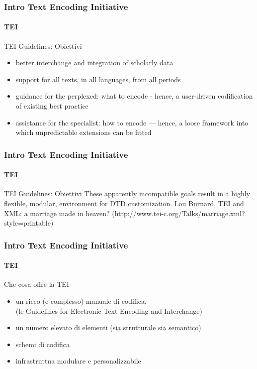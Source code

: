 \begin{frame}
	\frametitle{Intro Text Encoding Initiative}
	\framesubtitle{TEI}
	\addtocounter{nframe}{1}

	\begin{block}{TEI Guidelines: Obiettivi}
		\begin{itemize}
			\item better interchange and integration of scholarly data
			\item support for all texts, in all languages, from all periods
			\item guidance for the perplexed: what to encode - hence, a user-driven codification of existing best practice
			\item assistance for the specialist: how to encode --- hence, a loose framework into which unpredictable extensions can be fitted
		\end{itemize}
	\end{block}

\end{frame}



\begin{frame}
	\frametitle{Intro Text Encoding Initiative}
	\framesubtitle{TEI}
	\addtocounter{nframe}{1}

	\begin{block}{TEI Guidelines: Obiettivi}
		These apparently incompatible goals result in a highly flexible,
		modular, environment for DTD customization.
		Lou Burnard, TEI and XML: a marriage made in heaven?
		(http://www.tei-c.org/Talks/marriage.xml?style=printable)
	\end{block}

\end{frame}


\begin{frame}
	\frametitle{Intro Text Encoding Initiative}
	\framesubtitle{TEI}
	\addtocounter{nframe}{1}

	\begin{block}{Che cosa offre la TEI}
        \begin{itemize}
            \item un ricco (e complesso) manuale di codifica, 
            \\(le Guidelines for Electronic Text Encoding and Interchange)
            \item un numero elevato di elementi (sia strutturale sia semantico)
            \item schemi di codifica
            \item infrastruttua modulare e personalizzabile
        \end{itemize}

	\end{block}

\end{frame}

